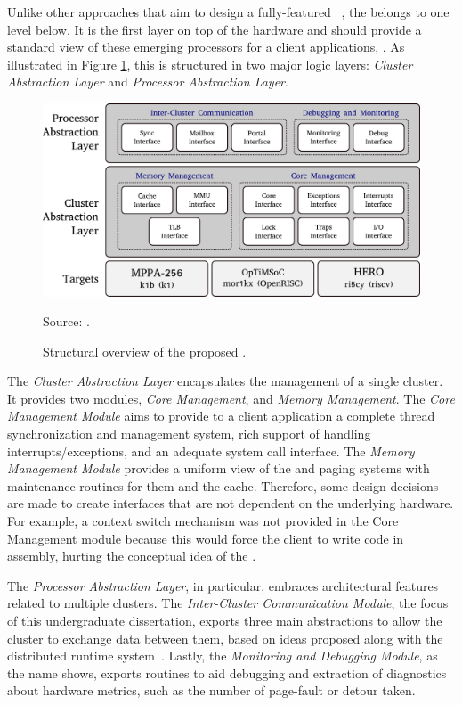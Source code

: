 		Unlike other approaches that aim to design a fully-featured \os~\cite{Baumann2009,kluge2014,nightingale2009,rhoden2011},
		the \hal belongs to one level below.
		It is the first layer on top of the hardware and should provide a standard
		view of these emerging processors for a client applications, \eg \os.
		As illustrated in Figure \ref{fig.hal-struct}, this \hal is structured in
		two major logic layers: \textit{Cluster Abstraction Layer} and \textit{Processor Abstraction Layer}.

		\begin{figure}[t]
			\centering
			\caption{Structural overview of the proposed \hal.}

			\includegraphics[width=.9\textwidth]{images/hal-struct.pdf}

			Source: \cite{penna:compas19}.

		\label{fig.hal-struct}
		\end{figure}

		The \textit{Cluster Abstraction Layer} encapsulates the management of a single cluster.
		It provides two modules, \textit{Core Management}, and \textit{Memory Management}.
		The \textit{Core Management Module} aims to provide to a client application a complete
		thread synchronization and management system, rich support of handling
		interrupts/exceptions, and an adequate system call interface.
		The \textit{Memory Management Module} provides a uniform view of the \tlbs
		and paging systems with maintenance routines for them and the cache.
		Therefore, some design decisions are made to create interfaces that are not
		dependent on the underlying hardware.
		For example, a context switch mechanism was not provided in the
		Core Management module because this would force the client \os
		to write code in assembly, hurting the conceptual idea of the \hal.

		The \textit{Processor Abstraction Layer}, in particular, embraces
		architectural features related to multiple clusters.
		The \textit{Inter-Cluster Communication Module}, the focus of
		this undergraduate dissertation, exports three main abstractions to allow the
		cluster to exchange data between them, based on ideas proposed along with the
		\nodeos distributed runtime system~\cite{DeDinechin2013-1}.
		Lastly, the \textit{Monitoring and Debugging Module}, as the
		name shows, exports routines to aid debugging and extraction
		of diagnostics about hardware metrics, such as the number of
		page-fault or detour taken.

